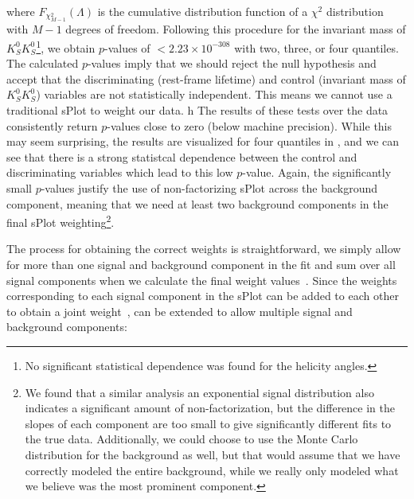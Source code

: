 where $F_{\chi^2_{M-1}}(\Lambda)$ is the cumulative distribution function of a $\chi^2$ distribution with $M-1$ degrees of freedom. Following this procedure for the invariant mass of $K_S^0K_S^0$\footnote{No significant statistical dependence was found for the helicity angles.}, we obtain $p$-values of $<2.23\times10^{-308}$ with two, three, or four quantiles. The calculated $p$-values imply that we should reject the null hypothesis and accept that the discriminating (rest-frame lifetime) and control (invariant mass of $K_S^0K_S^0$) variables are not statistically independent. This means we cannot use a traditional sPlot to weight our data.
                                                                                                                                                                                                                                                                                                                                                                                                                    h
The results of these tests over the data consistently return $p$-values close to zero (below machine precision). While this may seem surprising, the results are visualized for four quantiles in , and we can see that there is a strong statistcal dependence between the control and discriminating variables which lead to this low $p$-value. Again, the significantly small $p$-values justify the use of non-factorizing sPlot across the background component, meaning that we need at least two background components in the final sPlot weighting\footnote{We found that a similar analysis an exponential signal distribution also indicates a significant amount of non-factorization, but the difference in the slopes of each component are too small to give significantly different fits to the true data. Additionally, we could choose to use the Monte Carlo distribution for the background as well, but that would assume that we have correctly modeled the entire background, while we really only modeled what we believe was the most prominent component.}.

The process for obtaining the correct weights is straightforward, we simply allow for more than one signal and background component in the fit and sum over all signal components when we calculate the final weight values~\cite{Dembinski2022}. Since the weights corresponding to each signal component in the sPlot can be added to each other to obtain a joint weight~\cite{Pivk2005},  can be extended to allow multiple signal and background components:

